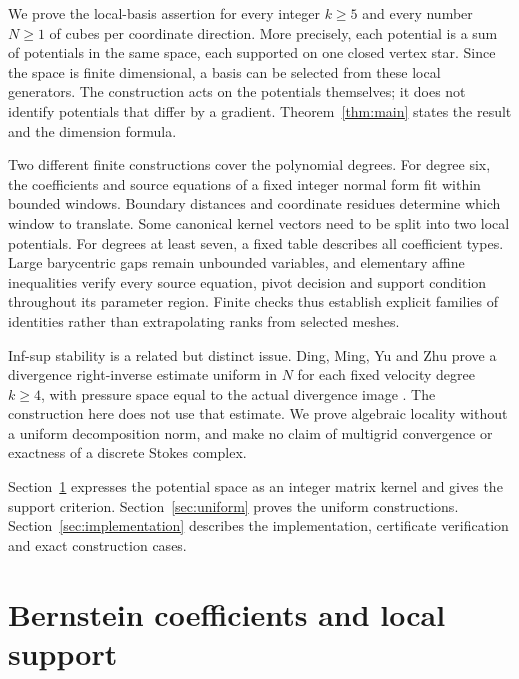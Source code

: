 \documentclass[11pt]{article}
\theoremstyle{remark}
\begin{document}
We prove the local-basis assertion for every integer $k\ge5$ and every
number $N\ge1$ of cubes per coordinate direction. More precisely, each
potential is a sum of potentials in the same space, each supported on one
closed vertex star. Since the space is finite dimensional, a basis can be
selected from these local generators. The construction acts on the potentials
themselves; it does not identify potentials that differ by a gradient.
Theorem~\ref{thm:main} states the result and the dimension formula.

Two different finite constructions cover the polynomial degrees. For degree
six, the coefficients and source equations of a fixed integer normal form
fit within bounded windows. Boundary distances and coordinate residues
determine which window to translate. Some canonical kernel vectors need to
be split into two local potentials. For degrees at least seven, a fixed
table describes all coefficient types. Large barycentric gaps remain
unbounded variables, and elementary affine inequalities verify every source
equation, pivot decision and support condition throughout its parameter
region. Finite checks thus establish explicit families of identities rather
than extrapolating ranks from selected meshes.

Inf-sup stability is a related but distinct issue. Ding, Ming, Yu and Zhu
prove a divergence right-inverse estimate uniform in $N$ for each fixed
velocity degree $k\ge4$, with pressure space equal to the actual divergence
image \cite[Theorem~2.1]{DMYZ}. The construction here does not use that
estimate. We prove algebraic locality without a uniform decomposition norm,
and make no claim of multigrid convergence or exactness of a discrete Stokes
complex.

Section~\ref{sec:coefficients} expresses the potential space as an integer
matrix kernel and gives the support criterion. Section~\ref{sec:uniform}
proves the uniform constructions. Section~\ref{sec:implementation} describes
the implementation, certificate verification and exact construction cases.

\section{Bernstein coefficients and local support}\label{sec:coefficients}
\end{document}
